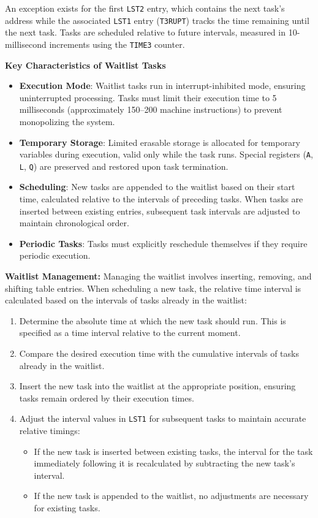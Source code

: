 \documentclass[refcap, oxford]{ahsan}
\begin{document}
An exception exists for the first \texttt{LST2} entry, which contains the next task's
address while the associated \texttt{LST1} entry (\texttt{T3RUPT}) tracks the time
remaining until the next task. Tasks are scheduled relative to future intervals,
measured in 10-millisecond increments using the \texttt{TIME3} counter.

\textbf{Key Characteristics of Waitlist Tasks}
\begin{itemize}
    \item \textbf{Execution Mode}: Waitlist tasks run in interrupt-inhibited mode,
        ensuring uninterrupted processing. Tasks must limit their execution time to 5
        milliseconds (approximately 150--200 machine instructions) to prevent
        monopolizing the system.
    \item \textbf{Temporary Storage}: Limited erasable storage is allocated for
        temporary variables during execution, valid only while the task runs. Special
        registers (\texttt{A}, \texttt{L}, \texttt{Q}) are preserved and restored upon
        task termination.
    \item \textbf{Scheduling}: New tasks are appended to the waitlist based on their
        start time, calculated relative to the intervals of preceding tasks. When tasks
        are inserted between existing entries, subsequent task intervals are adjusted
        to maintain chronological order.
    \item \textbf{Periodic Tasks}: Tasks must explicitly reschedule themselves if they
        require periodic execution.
\end{itemize}

\textbf{Waitlist Management:} Managing the waitlist involves inserting, removing, and
shifting table entries. When scheduling a new task, the relative time interval is
calculated based on the intervals of tasks already in the waitlist:
\begin{enumerate}
    \item Determine the absolute time at which the new task should run. This is
        specified as a time interval relative to the current moment.
    \item Compare the desired execution time with the cumulative intervals of tasks
        already in the waitlist.
    \item Insert the new task into the waitlist at the appropriate position, ensuring
        tasks remain ordered by their execution times.
    \item Adjust the interval values in \texttt{LST1} for subsequent tasks to maintain
        accurate relative timings:
    \begin{itemize}
        \item If the new task is inserted between existing tasks, the interval for the
            task immediately following it is recalculated by subtracting the new task's
            interval.
        \item If the new task is appended to the waitlist, no adjustments are necessary
            for existing tasks.
    \end{itemize}
\end{enumerate}
\end{document}
